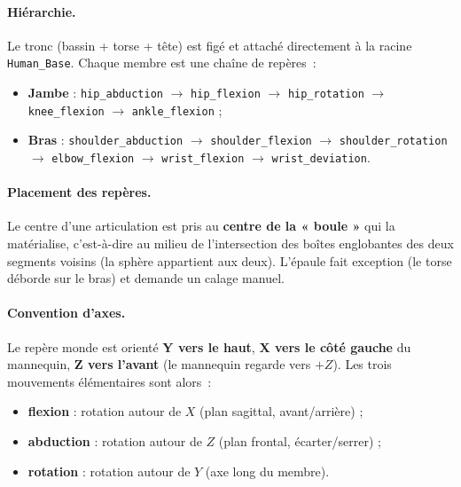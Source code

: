 \documentclass[12pt]{article}
\begin{document}
\paragraph{Hiérarchie.} Le tronc (bassin + torse + tête) est figé et attaché
directement à la racine \texttt{Human\_Base}. Chaque membre est une chaîne de
repères~:
{\sloppy
\begin{itemize}[noitemsep]
  \item \textbf{Jambe} : \texttt{hip\_abduction} $\to$ \texttt{hip\_flexion}
        $\to$ \texttt{hip\_rotation} $\to$ \texttt{knee\_flexion}
        $\to$ \texttt{ankle\_flexion} ;
  \item \textbf{Bras} : \texttt{shoulder\_abduction} $\to$
        \texttt{shoulder\_flexion} $\to$ \texttt{shoulder\_rotation}
        $\to$ \texttt{elbow\_flexion} $\to$ \texttt{wrist\_flexion}
        $\to$ \texttt{wrist\_deviation}.
\end{itemize}\par}

\paragraph{Placement des repères.} Le centre d'une articulation est pris au
\textbf{centre de la « boule »} qui la matérialise, c'est-à-dire au milieu de
l'intersection des boîtes englobantes des deux segments voisins (la sphère
appartient aux deux). L'épaule fait exception (le torse déborde sur le bras) et
demande un calage manuel.

\paragraph{Convention d'axes.} Le repère monde est orienté \textbf{Y vers le
haut}, \textbf{X vers le côté gauche} du mannequin, \textbf{Z vers l'avant} (le
mannequin regarde vers $+Z$). Les trois mouvements élémentaires sont alors~:
\begin{itemize}[noitemsep]
  \item \textbf{flexion} : rotation autour de $X$ (plan sagittal, avant/arrière) ;
  \item \textbf{abduction} : rotation autour de $Z$ (plan frontal, écarter/serrer) ;
  \item \textbf{rotation} : rotation autour de $Y$ (axe long du membre).
\end{itemize}
\end{document}
